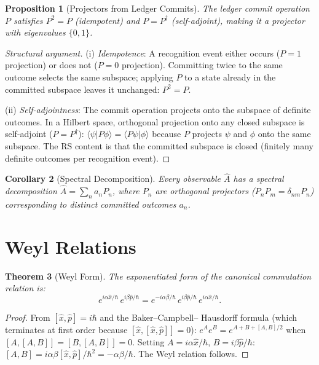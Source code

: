 \documentclass[12pt,a4paper]{article}
\newtheorem{theorem}{Theorem}[section]
\newtheorem{corollary}[theorem]{Corollary}
\newtheorem{proposition}[theorem]{Proposition}
\theoremstyle{definition}
\theoremstyle{remark}
\begin{document}
\begin{proposition}[Projectors from Ledger Commits]
\label{thm:projector}
The ledger commit operation $P$ satisfies $P^2 = P$ (idempotent)
and $P = P^\dagger$ (self-adjoint), making it a projector with
eigenvalues $\{0, 1\}$.
\end{proposition}

\begin{proof}[Structural argument]
(i) \emph{Idempotence}: A recognition event either occurs ($P = 1$
projection) or does not ($P = 0$ projection).  Committing twice to
the same outcome selects the same subspace; applying $P$ to a state
already in the committed subspace leaves it unchanged: $P^2 = P$.

(ii) \emph{Self-adjointness}: The commit operation projects onto
the subspace of definite outcomes.  In a Hilbert space, orthogonal
projection onto any closed subspace is self-adjoint ($P = P^\dagger$):
$\langle \psi | P\phi \rangle = \langle P\psi | \phi \rangle$
because $P$ projects $\psi$ and $\phi$ onto the same subspace.
The RS content is that the committed subspace is closed (finitely
many definite outcomes per recognition event).
\end{proof}

\begin{corollary}[Spectral Decomposition]
Every observable $\hat{A}$ has a spectral decomposition
$\hat{A} = \sum_n a_n P_n$, where $P_n$ are orthogonal
projectors ($P_n P_m = \delta_{nm} P_n$) corresponding to
distinct committed outcomes $a_n$.
\end{corollary}

\section{Weyl Relations}
\label{sec:weyl}

\begin{theorem}[Weyl Form]
\label{thm:weyl}
The exponentiated form of the canonical commutation relation is:
\begin{equation}
  e^{i\alpha\hat{x}/\hbar}\,e^{i\beta\hat{p}/\hbar}
  = e^{-i\alpha\beta/\hbar}\,
  e^{i\beta\hat{p}/\hbar}\,e^{i\alpha\hat{x}/\hbar}.
\end{equation}
\end{theorem}

\begin{proof}
From $[\hat{x}, \hat{p}] = i\hbar$ and the Baker--Campbell--
Hausdorff formula (which terminates at first order because
$[\hat{x}, [\hat{x}, \hat{p}]] = 0$):
$e^{A}e^{B} = e^{A+B+[A,B]/2}$ when $[A,[A,B]] = [B,[A,B]] = 0$.
Setting $A = i\alpha\hat{x}/\hbar$, $B = i\beta\hat{p}/\hbar$:
$[A,B] = i\alpha\beta[\hat{x},\hat{p}]/\hbar^2 =
-\alpha\beta/\hbar$.  The Weyl relation follows.
\end{proof}
\end{document}
